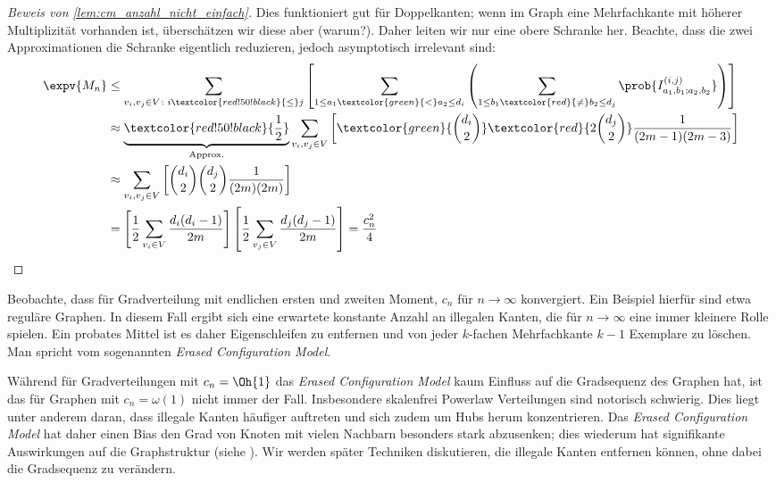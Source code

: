 \begin{proof}[Beweis von \cref{lem:cm_anzahl_nicht_einfach}]
    Dies funktioniert gut für Doppelkanten; wenn im Graph eine Mehrfachkante mit höherer Multiplizität vorhanden ist, überschätzen wir diese aber (warum?).
    Daher leiten wir nur eine obere Schranke her.
    Beachte, dass die zwei Approximationen die Schranke eigentlich reduzieren, jedoch asymptotisch irrelevant sind:
    \begin{align}
        \expv{M_n}
         & \le \sum_{v_i, v_j \in V\colon i \textcolor{red!50!black}{\le} j} \left[ \sum_{1 \le a_1 \textcolor{green}{<} a_2 \le d_i} \left( \sum_{1 \le b_1 \textcolor{red}{\ne} b_2 \le d_j} \prob{I^{(i,j)}_{a_1,b_1;a_2,b_2}} \right) \right] \\
         & \approx \underbrace{\textcolor{red!50!black}{\frac 1 2}}_\text{Approx.} \sum_{v_i, v_j \in V} \left[ \textcolor{green}{\binom{d_i}{2}} \textcolor{red}{2\binom{d_j}{2}} \frac{1}{(2m - 1)(2m - 3)}   \right]                           \\
         & \approx \sum_{v_i, v_j \in V} \left[ \binom{d_i}{2} \binom{d_j}{2} \frac{1}{(2m)(2m)}   \right]                                                                                                                                        \\
         & = \left[ \frac{1}{2} \sum_{v_i \in V} \frac{d_i (d_i - 1)}{2m}  \right] \left[ \frac{1}{2} \sum_{v_j \in V} \frac{d_j (d_j - 1)}{2m} \right]
        = \frac{c_n^2}{4} \qedhere
    \end{align}
\end{proof}

Beobachte,  dass für Gradverteilung mit endlichen ersten und zweiten Moment, $c_n$ für $n \to \infty$ konvergiert.
Ein Beispiel hierfür sind etwa reguläre Graphen.
In diesem Fall ergibt sich eine erwartete konstante Anzahl an illegalen Kanten, die für $n \to \infty$ eine immer kleinere Rolle spielen.
Ein probates Mittel ist es daher Eigenschleifen zu entfernen und von jeder $k$-fachen Mehrfachkante $k{-}1$ Exemplare zu löschen.
Man spricht vom sogenannten \emph{Erased Configuration Model}.

Während für Gradverteilungen mit $c_n = \Oh{1}$ das \emph{Erased Configuration Model} kaum Einfluss auf die Gradsequenz des Graphen hat, ist das für Graphen mit $c_n = \omega(1)$ nicht immer der Fall.
Insbesondere skalenfrei Powerlaw Verteilungen sind notorisch schwierig.
Dies liegt unter anderem daran, dass illegale Kanten häufiger auftreten und sich zudem um Hubs herum konzentrieren.
Das \emph{Erased Configuration Model} hat daher einen Bias den Grad von Knoten mit vielen Nachbarn besonders stark abzusenken;
dies wiederum hat signifikante Auswirkungen auf die Graphstruktur (siehe \zB \cite{DBLP:journals/snam/SchlauchHZ15}).
Wir werden später Techniken diskutieren, die illegale Kanten entfernen können, ohne dabei die Gradsequenz zu verändern.

